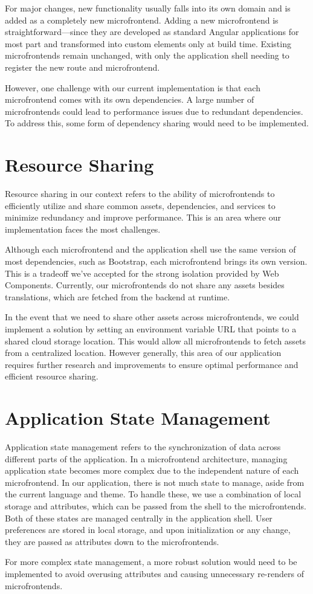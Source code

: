 For major changes, new functionality usually falls into its own domain and is added as a completely new microfrontend. Adding a new microfrontend is straightforward—since they are developed as standard Angular applications for most part and transformed into custom elements only at build time. Existing microfrontends remain unchanged, with only the application shell needing to register the new route and microfrontend.

However, one challenge with our current implementation is that each microfrontend comes with its own dependencies. A large number of microfrontends could lead to performance issues due to redundant dependencies. To address this, some form of dependency sharing would need to be implemented.

\section{Resource Sharing}
Resource sharing in our context refers to the ability of microfrontends to efficiently utilize and share common assets, dependencies, and services to minimize redundancy and improve performance. This is an area where our implementation faces the most challenges.

Although each microfrontend and the application shell use the same version of most dependencies, such as Bootstrap, each microfrontend brings its own version. This is a tradeoff we've accepted for the strong isolation provided by Web Components. Currently, our microfrontends do not share any assets besides translations, which are fetched from the backend at runtime.

In the event that we need to share other assets across microfrontends, we could implement a solution by setting an environment variable URL that points to a shared cloud storage location. This would allow all microfrontends to fetch assets from a centralized location. However generally, this area of our application requires further research and improvements to ensure optimal performance and efficient resource sharing.

\section{Application State Management}
Application state management refers to the synchronization of data across different parts of the application. In a microfrontend architecture, managing application state becomes more complex due to the independent nature of each microfrontend. In our application, there is not much state to manage, aside from the current language and theme. To handle these, we use a combination of local storage and attributes, which can be passed from the shell to the microfrontends. Both of these states are managed centrally in the application shell. User preferences are stored in local storage, and upon initialization or any change, they are passed as attributes down to the microfrontends.

For more complex state management, a more robust solution would need to be implemented to avoid overusing attributes and causing unnecessary re-renders of microfrontends.